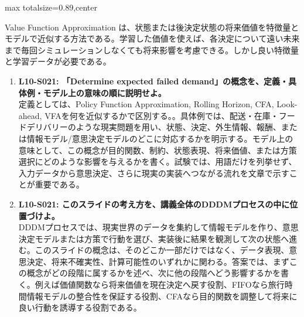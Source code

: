 \begin{minipage}[t]{0.58\textwidth}
\begin{adjustbox}{max totalsize={\textwidth}{0.89\textheight},center}
\begin{minipage}{\textwidth}
Value Function Approximation は、状態または後決定状態の将来価値を特徴量とモデルで近似する方法である。学習した価値を使えば、各決定について遠い未来まで毎回シミュレーションしなくても将来影響を考慮できる。しかし良い特徴量と学習データが必要である。\par{}\begin{enumerate}\item \textbf{L10-S021: 「Determine expected failed demand」の概念を、定義・具体例・モデル上の意味の順に説明せよ。}\\定義としては、Policy Function Approximation, Rolling Horizon, CFA, Look-ahead, VFAを何を近似するかで区別する。。具体例では、配送・在庫・フードデリバリーのような現実問題を用い、状態、決定、外生情報、報酬、または情報モデル/意思決定モデルのどこに対応するかを明示する。モデル上の意味として、この概念が目的関数、制約、状態表現、将来価値、または方策選択にどのような影響を与えるかを書く。試験では、用語だけを列挙せず、入力データから意思決定、さらに現実の実装へつながる流れを文章で示すことが重要である。\item \textbf{L10-S021: このスライドの考え方を、講義全体のDDDMプロセスの中に位置づけよ。}\\DDDMプロセスでは、現実世界のデータを集約して情報モデルを作り、意思決定モデルまたは方策で行動を選び、実装後に結果を観測して次の状態へ進む。このスライドの概念は、そのどこか一部だけではなく、データ表現、意思決定、将来不確実性、計算可能性のいずれかに関わる。答案では、まずこの概念がどの段階に属するかを述べ、次に他の段階へどう影響するかを書く。例えば価値関数なら将来価値を現在決定へ戻す役割、FIFOなら旅行時間情報モデルの整合性を保証する役割、CFAなら目的関数を調整して将来に良い行動を誘導する役割である。\end{enumerate}
\end{minipage}
\end{adjustbox}
\end{minipage}


